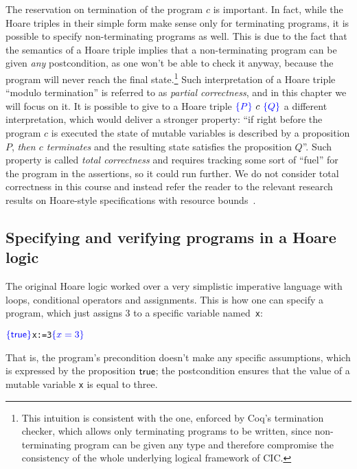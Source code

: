 

The reservation on termination of the program $c$ is important. In
fact, while the Hoare triples in their simple form make sense only for
terminating programs, it is possible to specify non-terminating
programs as well. This is due to the fact that the semantics of a
Hoare triple implies that a non-terminating program can be given \textit{any}
postcondition, as one won't be able to check it anyway, because the
program will never reach the final state.\footnote{This intuition is
consistent with the one, enforced by Coq's termination checker, which
allows only terminating programs to be written, since non-terminating
program can be given any type and therefore compromise the consistency
of the whole underlying logical framework of CIC.} Such
interpretation of a Hoare triple ``modulo termination'' is referred to
as \textit{partial correctness}, and in this chapter we will focus on it. It
is possible to give to a Hoare triple $\textcolor{blue}{\left\{{P}\right\}}~c~\textcolor{blue}{\left\{{Q}\right\}}$ a
different interpretation, which would deliver a stronger property: ``if
right before the program $c$ is executed the state of mutable
variables is described by a proposition $P$, \textit{then $c$ terminates} and
the resulting state satisfies the proposition $Q$''. Such property is
called \textit{total correctness} and requires tracking some sort of ``fuel''
for the program in the assertions, so it could run further. We do not
consider total correctness in this course and instead refer the reader
to the relevant research results on Hoare-style specifications with
resource bounds~\cite{Dockins-Hobor:DS10}.


\subsection{Specifying and verifying programs in a Hoare logic}


\label{sec:hoare-primer}


The original Hoare logic worked over a very simplistic imperative
language with loops, conditional operators and assignments. This is
how one can specify a program, which just assigns 3 to a specific
variable named~\texttt{x}: 


 \begin{alltt} \(\spec{\True}\) x := 3 \(\spec{x = 3}\) \end{alltt} 


That is, the program's precondition doesn't make any specific
assumptions, which is expressed by the proposition $\mathsf{true}$; the
postcondition ensures that the value of a mutable variable
\texttt{x} is equal to three.


